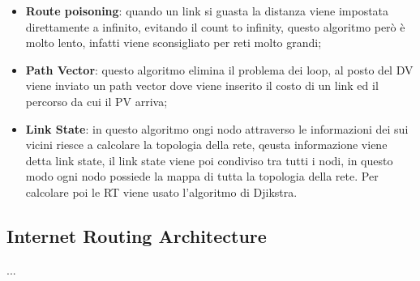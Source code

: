 \documentclass[12pt]{article}
\begin{document}
\begin{itemize}
\begin{figure}[H]
            \caption{Path Hold Down}
            \label{fig:path-hold-down}
        \end{figure}
        Il paht hold down non risolve il problema del count to infinity, questo pu\`o essere superato dall'utilizzo combinato con lo spli horizon;
    \item \textbf{Route poisoning}: quando un link si guasta la distanza viene impostata direttamente a infinito, evitando il count to infinity, questo algoritmo per\`o \`e molto lento, infatti viene sconsigliato per reti molto grandi;
    \item \textbf{Path Vector}: questo algoritmo elimina il problema dei loop, al posto del DV viene inviato un path vector dove viene inserito il costo di un link ed il percorso da cui il PV arriva;
    \item \textbf{Link State}: in questo algoritmo ongi nodo attraverso le informazioni dei sui vicini riesce a calcolare la topologia della rete, qeusta informazione viene detta link state, il link state viene poi condiviso tra tutti i nodi, in questo modo ogni nodo possiede la mappa di tutta la topologia della rete. Per calcolare poi le RT viene usato l'algoritmo di Djikstra.
\end{itemize}


\subsection{Internet Routing Architecture}
...
\end{document}
